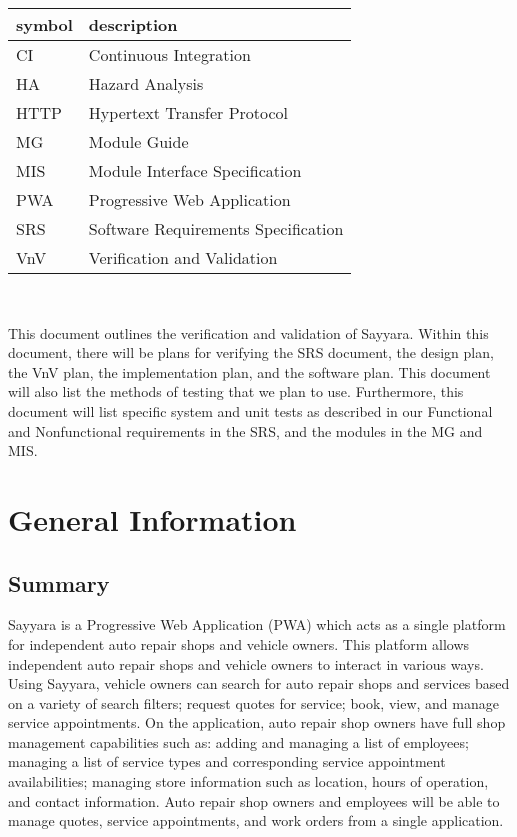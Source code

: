 \documentclass[12pt, titlepage]{article}
\begin{document}
\renewcommand{\arraystretch}{1.2}
\begin{tabular}{l l}
	\toprule
	\textbf{symbol} & \textbf{description}                \\
	\midrule
	CI              & Continuous Integration              \\
	HA              & Hazard Analysis                     \\
	HTTP            & Hypertext Transfer Protocol         \\
	MG              & Module Guide                        \\
	MIS             & Module Interface Specification      \\
	PWA             & Progressive Web Application         \\
	SRS             & Software Requirements Specification \\
	VnV             & Verification and Validation         \\
	\bottomrule
\end{tabular}\\

\newpage


This document outlines the verification and validation of Sayyara. Within this document, there will
be plans for verifying the SRS document, the design plan, the VnV plan, the implementation plan,
and the software plan. This document will also list the methods of testing that we plan to use.
Furthermore, this document will list specific system and unit tests as described in our Functional
and Nonfunctional requirements in the SRS, and the modules in the MG and MIS.

\section{General Information}

\subsection{Summary}

Sayyara is a Progressive Web Application (PWA) which acts as a single platform for independent auto
repair shops and vehicle owners. This platform allows independent auto repair shops and vehicle
owners to interact in various ways. Using Sayyara, vehicle owners can search for auto repair shops
and services based on a variety of search filters; request quotes for service; book, view, and
manage service appointments. On the application, auto repair shop owners have full shop management
capabilities such as: adding and managing a list of employees; managing a list of service types and
corresponding service appointment availabilities; managing store information such as location,
hours of operation, and contact information. Auto repair shop owners and employees will be able to
manage quotes, service appointments, and work orders from a single application.
\end{document}
